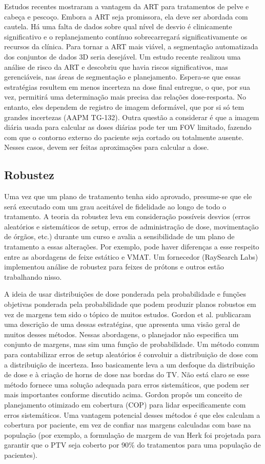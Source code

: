 \documentclass[11pt,a4paper]{article}
\newcounter{exemplo}
\begin{document}
	Estudos recentes mostraram a vantagem da ART para tratamentos de pelve e cabeça e pescoço. Embora a ART seja promissora, ela deve ser abordada com cautela. Há uma falta de dados sobre qual nível de desvio é clinicamente significativo e o replanejamento contínuo sobrecarregará significativamente os recursos da clínica. Para tornar a ART mais viável, a segmentação automatizada dos conjuntos de dados 3D seria desejável. Um estudo recente realizou uma análise de risco da ART e descobriu que havia riscos significativos, mas gerenciáveis, nas áreas de segmentação e planejamento. Espera-se que essas estratégias resultem em menos incerteza na dose final entregue, o que, por sua vez, permitirá uma determinação mais precisa das relações dose-resposta. No entanto, eles dependem de registro de imagem deformável, que por si só tem grandes incertezas (AAPM TG-132). Outra questão a considerar é que a imagem diária usada para calcular as doses diárias pode ter um FOV limitado, fazendo com que o contorno externo do paciente seja cortado ou totalmente ausente. Nesses casos, devem ser feitas aproximações para calcular a dose.

\subsection*{Robustez}

	Uma vez que um plano de tratamento tenha sido aprovado, presume-se que ele será executado com um grau aceitável de fidelidade ao longo de todo o tratamento. A teoria da robustez leva em consideração possíveis desvios (erros aleatórios e sistemáticos de setup, erros de administração de dose, movimentação de órgãos, etc.) durante um curso e avalia a sensibilidade de um plano de tratamento a essas alterações. Por exemplo, pode haver diferenças a esse respeito entre as abordagens de feixe estático e VMAT. Um fornecedor (RaySearch Labs) implementou análise de robustez para feixes de prótons e outros estão trabalhando nisso. 

	A ideia de usar distribuições de dose ponderada pela probabilidade e funções objetivas ponderada pela probabilidade que podem produzir planos robustos em vez de margens tem sido o tópico de muitos estudos. Gordon et al. publicaram uma descrição de uma dessas estratégias, que apresenta uma visão geral de muitos desses métodos. Nessas abordagens, o planejador não especifica um conjunto de margens, mas sim uma função de probabilidade. Um método comum para contabilizar erros de setup aleatórios é convoluir a distribuição de dose com a distribuição de incerteza. Isso basicamente leva a um desfoque da distribuição de dose e à criação de horns de dose nas bordas do TV. Não está claro se esse método fornece uma solução adequada para erros sistemáticos, que podem ser mais importantes conforme discutido acima. Gordon propôs um conceito de planejamento otimizado em cobertura (COP) para lidar especificamente com erros sistemáticos. Uma vantagem potencial desses métodos é que eles calculam a cobertura por paciente, em vez de confiar nas margens calculadas com base na população (por exemplo, a formulação de margem de van Herk foi projetada para garantir que o PTV seja coberto por 90\% do tratamentos para uma população de pacientes).


\end{document}

